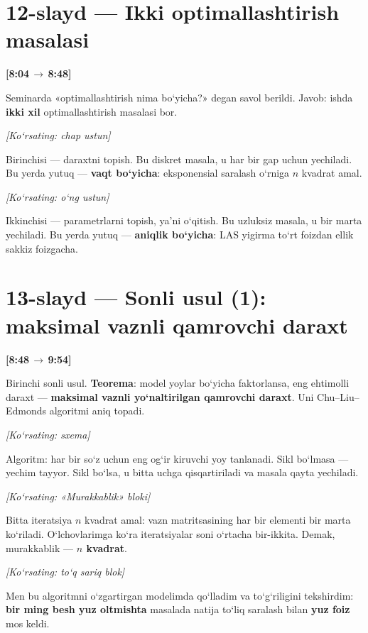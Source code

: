 \documentclass[14pt,a4paper]{extarticle}
\let\origsection\section
\renewcommand{\section}{\Needspace*{9\baselineskip}\origsection}
\newcommand{\timing}[2]{%
   \par\nobreak\noindent\textbf{[#1\,$\to$\,#2]}\par\vspace{0.3em}}
\newcommand{\say}[1]{\textbf{#1}}
\newcommand{\pointto}[1]{\par\vspace{0.3em}\noindent\textit{\small
   [Ko‘rsating: #1]}\par}
\begin{document}
\section*{12-slayd --- Ikki optimallashtirish masalasi}
\timing{8:04}{8:48}

Seminarda «optimallashtirish nima bo‘yicha?» degan savol berildi. Javob: ishda
\textbf{ikki xil} optimallashtirish masalasi bor.

\pointto{chap ustun}

Birinchisi --- daraxtni topish. Bu diskret masala, u har bir gap uchun yechiladi.
Bu yerda yutuq --- \say{vaqt bo‘yicha}: eksponensial saralash o‘rniga $n$ kvadrat amal.

\pointto{o‘ng ustun}

Ikkinchisi --- parametrlarni topish, ya’ni o‘qitish. Bu uzluksiz masala, u bir marta
yechiladi. Bu yerda yutuq --- \say{aniqlik bo‘yicha}: LAS yigirma to‘rt foizdan ellik
sakkiz foizgacha.

\section*{13-slayd --- Sonli usul (1): maksimal vaznli qamrovchi daraxt}
\timing{8:48}{9:54}

Birinchi sonli usul. \textbf{Teorema}: model yoylar bo‘yicha faktorlansa, eng ehtimolli
daraxt --- \textbf{maksimal vaznli yo‘naltirilgan qamrovchi daraxt}. Uni Chu--Liu--Edmonds
algoritmi aniq topadi.

\pointto{sxema}

Algoritm: har bir so‘z uchun eng og‘ir kiruvchi yoy tanlanadi. Sikl bo‘lmasa ---
yechim tayyor. Sikl bo‘lsa, u bitta uchga qisqartiriladi va masala qayta yechiladi.

\pointto{«Murakkablik» bloki}

Bitta iteratsiya $n$ kvadrat amal: vazn matritsasining har bir elementi bir marta
ko‘riladi. O‘lchovlarimga ko‘ra iteratsiyalar soni o‘rtacha bir-ikkita. Demak,
murakkablik --- \textbf{$n$ kvadrat}.

\pointto{to‘q sariq blok}

Men bu algoritmni o‘zgartirgan modelimda qo‘lladim va to‘g‘riligini tekshirdim:
\textbf{bir ming besh yuz oltmishta} masalada natija to‘liq saralash bilan \textbf{yuz
foiz} mos keldi.

\end{document}
